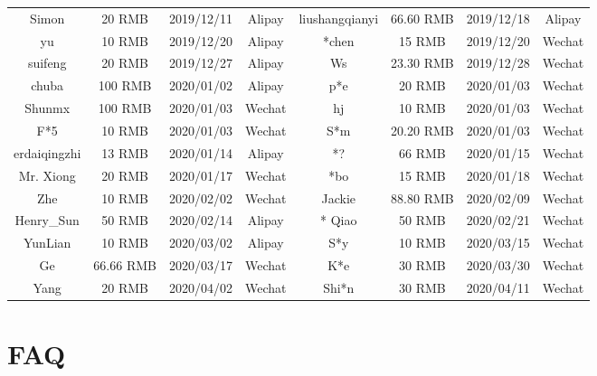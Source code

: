 \documentclass[11pt,en,cite=authoryear]{elegantpaper}
\begin{document}
\begin{table}[!htb]
\begin{tabular}{*{4}{>{\scriptsize}c}|*{4}{>{\scriptsize}c}}
	  Simon & 20 RMB & 2019/12/11 & Alipay   & liushangqianyi & 66.60 RMB & 2019/12/18 & Alipay \\
	  yu     & 10 RMB & 2019/12/20 & Alipay   & *chen   & 15 RMB & 2019/12/20 & Wechat \\
	  suifeng   & 20 RMB & 2019/12/27 & Alipay   & Ws    & 23.30 RMB & 2019/12/28 & Wechat \\
	  chuba    & 100 RMB  & 2020/01/02 & Alipay   & p*e   & 20 RMB & 2020/01/03 & Wechat \\
	  Shunmx & 100 RMB & 2020/01/03 & Wechat    & hj    & 10 RMB & 2020/01/03 & Wechat \\
	  F*5   & 10 RMB & 2020/01/03 & Wechat    & S*m   & 20.20 RMB & 2020/01/03 & Wechat \\
	  erdaiqingzhi  & 13 RMB & 2020/01/14 & Alipay   & *?    & 66 RMB & 2020/01/15 & Wechat \\
	  Mr. Xiong & 20 RMB & 2020/01/17 & Wechat    & *bo    & 15 RMB & 2020/01/18 & Wechat \\
	  *Zhe    & 10 RMB & 2020/02/02 & Wechat    &  Jackie &  88.80 RMB  &  2020/02/09 & Wechat \\
	  Henry\_Sun & 50 RMB & 2020/02/14 & Alipay & * Qiao  & 50 RMB & 2020/02/21 & Wechat \\
	  YunLian & 10 RMB & 2020/03/02 & Alipay & S*y  &  10 RMB  &  2020/03/15 & Wechat \\
	  * Ge  & 66.66 RMB & 2020/03/17 & Wechat    &   K*e & 30 RMB & 2020/03/30 & Wechat\\
	  * Yang  &  20 RMB  &  2020/04/02 & Wechat & Shi*n  & 30 RMB & 2020/04/11 & Wechat \\
	  \bottomrule
	\end{tabular}%
	\label{tab:donation}%
  \end{table}%

\section{FAQ}
\end{document}
